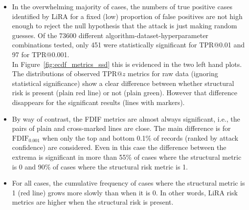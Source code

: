 

\begin{itemize}
    \item In the overwhelming majority of cases, the numbers of true positive cases identified by LiRA for a fixed (low) proportion of false positives are not high enough to reject the null hypothesis that the attack is just making random guesses. Of the 73600 different algorithm-dataset-hyperparameter combinations tested, only 451 were statistically significant for TPR@0.01 and 97 for TPR@0.001. \\
In Figure~\ref{fig:ecdf_metrics_ssd} this is evidenced in the two left hand plots. The distributions of observed $\text{TPR@}z$ metrics for raw data (ignoring statistical significance) show a clear difference between whether structural risk is present (plain red line) or not (plain green). However that difference disappears for the significant results (lines with markers).
    \item By way of contrast, the FDIF metrics are almost always significant, i.e., the pairs of plain and cross-marked lines are close. The main difference is for $\text{FDIF}_{0.001}$ when only the top and bottom 0.1\% of records (ranked by attack confidence) are considered. Even in this case the difference between the extrema is significant in more than 55\% of cases where the structural metric is 0 and 90\% of cases where the structural risk metric is 1.

    \item For all cases, the cumulative frequency of cases where the structural metric is 1 (red line) grows more slowly than when it is 0. In other words, LiRA risk metrics are higher when the structural risk is present.
\end{itemize}
